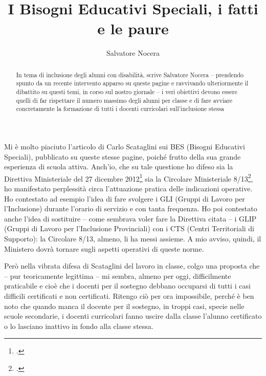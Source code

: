 \author{Salvatore Nocera}
\title{I Bisogni Educativi Speciali, i fatti e le paure }
\label{cha:nocera030613}
\begin{abstract}
In tema di inclusione degli alunni con disabilità, scrive Salvatore Nocera – prendendo spunto da un recente intervento apparso su queste pagine e ravvivando ulteriormente il dibattito su questi temi, in corso sul nostro giornale – i veri obiettivi devono essere quelli di far rispettare il numero massimo degli alunni per classe e di fare avviare concretamente la formazione di tutti i docenti curricolari sull'inclusione stessa
\end{abstract}
\maketitle
{}
Mi è molto piaciuto l'articolo di Carlo Scataglini sui BES (Bisogni Educativi Speciali), pubblicato\pageref{cha:scataglini1} su queste stesse pagine, poiché frutto della sua grande esperienza di scuola attiva. Anch'io, che su tale questione ho difeso sia la Direttiva Ministeriale del 27 dicembre 2012\footcite{dir27Dic2012} sia la Circolare Ministeriale 8/13\footcite{cm8_2013}, ho manifestato perplessità circa l'attuazione pratica delle indicazioni operative. Ho contestato ad esempio l'idea di fare svolgere i GLI (Gruppi di Lavoro per l'Inclusione) durante l'orario di servizio e con tanta frequenza. Ho poi contestato anche l'idea di sostituire – come sembrava voler fare la Direttiva citata – i GLIP (Gruppi di Lavoro per l'Inclusione Provinciali) con i CTS (Centri Territoriali di Supporto): la Circolare 8/13, almeno, li ha messi assieme. A mio avviso, quindi, il Ministero dovrà tornare sugli aspetti operativi di queste norme.

Però nella vibrata difesa di Scataglini del lavoro in classe, colgo una proposta che – pur teoricamente legittima – mi sembra, almeno per oggi, difficilmente praticabile e cioè che i docenti per il sostegno debbano occuparsi di tutti i casi difficili certificati e non certificati. Ritengo ciò per ora impossibile, perché è ben noto che quando manca il docente per il sostegno, in troppi casi, specie nelle scuole secondarie, i docenti curricolari fanno uscire dalla classe l'alunno certificato o lo lasciano inattivo in fondo alla classe stessa.

